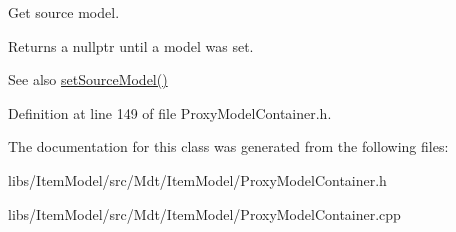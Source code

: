 Get source model. 

Returns a nullptr until a model was set.

\begin{DoxySeeAlso}{See also}
\hyperlink{class_mdt_1_1_item_model_1_1_proxy_model_container_a74f1afaa5c2002a6c0f7d31caed4fb2e}{set\+Source\+Model()} 
\end{DoxySeeAlso}


Definition at line 149 of file Proxy\+Model\+Container.\+h.



The documentation for this class was generated from the following files\+:\begin{DoxyCompactItemize}
\item 
libs/\+Item\+Model/src/\+Mdt/\+Item\+Model/Proxy\+Model\+Container.\+h\item 
libs/\+Item\+Model/src/\+Mdt/\+Item\+Model/Proxy\+Model\+Container.\+cpp\end{DoxyCompactItemize}
